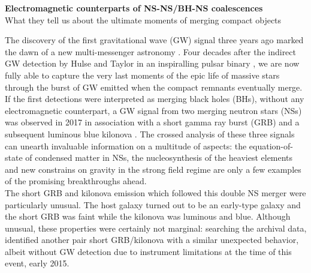 \documentclass[11pt,onecolumn]{article}
\title{	
\vspace*{-2.5cm}
}
\author{\tiny} %
\date{\tiny }%
\makeatletter
\newcommand{\gw}{GW\xspace}
\newcommand{\grb}{GRB\xspace}
\newcommand*{\ns}{NS\@\xspace}
\newcommand*{\nss}{NSs\@\xspace}
\newcommand*{\bhs}{BHs\@\xspace}
\makeatother
\begin{document}


\renewcommand{\headrulewidth}{1pt}
\pagestyle{fancy}
\fancyhf{}
\rfoot{\thepage / \pageref{LastPage}}

\vspace*{-1.2cm}
\begin{center}
\Large \textbf{Electromagnetic counterparts of NS-NS/BH-NS coalescences}\\
\large What they tell us about the ultimate moments of merging compact objects
\end{center}
\normalfont

%

The discovery of the first gravitational wave (\gw) signal three years ago marked the dawn of a new multi-messenger astronomy \citep{Abbott2016}. Four decades after the indirect \gw detection by Hulse and Taylor in an inspiralling pulsar binary \citep{Hulse1974}, we are now fully able to capture the very last moments of the epic life of massive stars through the burst of \gw emitted when the compact remnants eventually merge. If the first detections were interpreted as merging black holes (\bhs), without any electromagnetic counterpart, a \gw signal from two merging neutron stars (\nss) was observed in 2017 in association with a short gamma ray burst (\grb) and a subsequent luminous blue kilonova \citep{TheLIGOScientificCollaboration2017}. The crossed analysis of these three signals can unearth invaluable information on a multitude of aspects: the equation-of-state of condensed matter in \nss, the nucleosynthesis of the heaviest elements and new constrains on gravity in the strong field regime are only a few examples of the promising breakthroughs ahead. \\

The short \grb and kilonova emission which followed this double \ns merger were particularly unusual. The host galaxy turned out to be an early-type galaxy and the short \grb was faint while the kilonova was luminous and blue. Although unusual, these properties were certainly not marginal: searching the archival data, \citet{Troja2018} identified another pair short \grb/kilonova with a similar unexpected behavior, albeit without \gw detection due to instrument limitations at the time of this event, early 2015.\\
\end{document}
